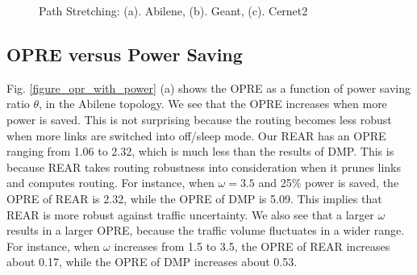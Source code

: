 \documentclass[conference]{IEEEtran}
\begin{document}
\begin{figure}[!t]
\centering
\vspace*{0.1in}
\caption{Path Stretching: (a). Abilene, (b). Geant, (c). Cernet2}
\label{figure_exp4_path}
\vspace*{0.1in}
\end{figure}

\subsection{OPRE versus Power Saving}
Fig. \ref{figure_opr_with_power} (a) shows the OPRE as a function of power saving ratio $\theta$, in the Abilene topology. We see that the OPRE increases when more power is saved.
This is not surprising because the routing becomes less robust when more links are switched into off/sleep mode. Our REAR has an OPRE ranging from 
1.06 to 2.32, which is much less than the results of DMP. This is because REAR takes routing robustness into consideration when it prunes 
links and computes routing. For instance, when $\omega = 3.5$ and 25\% power is saved, the OPRE of REAR is 2.32, while the OPRE of DMP is 5.09. 
This implies that REAR is more robust against traffic uncertainty. We also see that a larger $\omega$ results in a larger OPRE, because 
the traffic volume fluctuates in a wider range. For instance, when $\omega$ increases from 1.5 to 3.5, the OPRE of REAR increases about 
0.17, while the OPRE of DMP increases about 0.53.
\end{document}
